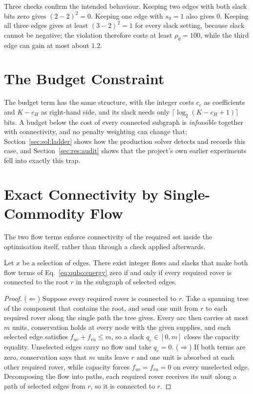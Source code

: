 Three checks confirm the intended behaviour. Keeping two edges with both
slack bits zero gives $(2-2)^2=0$. Keeping one edge with $s_0=1$ also gives
$0$. Keeping all three edges gives at least $(3-2)^2=1$ for every slack
setting, because slack cannot be negative; the violation therefore costs at
least $\rho_d=100$, while the third edge can gain at most about $1.2$.

\section{The Budget Constraint}

The budget term has the same structure, with the integer costs $c_e$ as
coefficients and $K-c_H$ as right-hand side, and its slack needs only
$\lceil\log_2(K-c_H+1)\rceil$ bits. A budget below the cost of every connected
subgraph is \emph{infeasible} together with connectivity, and no penalty
weighting can change that; Section~\ref{sec:sol:ladder} shows how the
production solver detects and records this case, and
Section~\ref{sec:res:audit} shows that the project's own earlier experiments
fell into exactly this trap.

\section{Exact Connectivity by Single-Commodity Flow}

The two flow terms enforce connectivity of the required set inside the
optimisation itself, rather than through a check applied afterwards.

\begin{proposition}
Let $x$ be a selection of edges. There exist integer flows and slacks that
make both flow terms of Eq.~\eqref{eq:qubo:energy} zero if and only if every
required rover is connected to the root $r$ in the subgraph of selected
edges.
\end{proposition}

\begin{proof}
($\Leftarrow$) Suppose every required rover is connected to $r$. Take a
spanning tree of the component that contains the root, and send one unit from
$r$ to each required rover along the single path the tree gives. Every arc then carries at most $m$ units,
conservation holds at every node with the given supplies, and each selected
edge satisfies $f_{uv}+f_{vu}\le m$, so a slack $q_e\in[0,m]$ closes the
capacity equality. Unselected edges carry no flow and take $q_e=0$.
($\Rightarrow$) If both terms are zero, conservation says that $m$ units leave
$r$ and one unit is absorbed at each other required rover, while capacity
forces $f_{uv}=f_{vu}=0$ on every unselected edge. Decomposing the flow into
paths, each required rover receives its unit along a path of selected edges
from $r$, so it is connected to $r$.
\end{proof}



